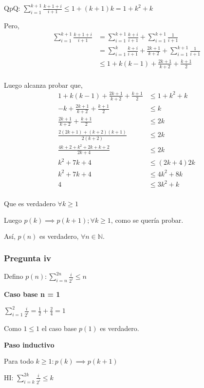 QpQ: $ \sum_{i=1}^{k+1}\frac{k+1+i}{i+1} \leq 1+(k+1)k = 1+k^2 + k$

Pero,
\begin{align*}
    \sum_{i=1}^{k+1}\frac{k+1+i}{i+1} &= \sum_{i=1}^{k+1}\frac{k+i}{i+1} + \sum_{i=1}^{k+1}\frac{1}{i+1} \\
    &= \sum_{i=1}^{k}\frac{k+i}{i+1} + \frac{2k+1}{k+2} + \sum_{i=1}^{k+1}\frac{1}{i+1} \\
    &\leq 1+k(k-1) + \frac{2k+1}{k+2} + \frac{k+1}{2} \\
\end{align*}

Luego alcanza probar que,
\begin{align*}
    1+k(k-1) + \frac{2k+1}{k+2} + \frac{k+1}{2} &\leq 1+k^2 + k \\
    - k + \frac{2k+1}{k+2} + \frac{k+1}{2} &\leq k \\
    \frac{2k+1}{k+2} + \frac{k+1}{2} &\leq 2k \\
    \frac{2(2k+1) + (k+2)(k+1)}{2(k+2)} &\leq 2k \\
    \frac{4k+2 + k^2+2k+k+2}{2k+4} &\leq 2k \\
    k^2 + 7k + 4 &\leq (2k+4)2k \\
    k^2 + 7k + 4 &\leq 4k^2 + 8k \\
    4 &\leq 3k^2 + k\\
\end{align*}

Que es verdadero $\forall k \geq 1$

Luego $p(k) \implies p(k+1); \forall k \geq 1$, como se quería probar.

Así, $p(n)$ es verdadero, $\forall n \in \mathbb{N}$.

\subsubsection{Pregunta iv}

Defino $ p(n): \sum_{i=n}^{2n}\frac{i}{2^i} \leq n$

\textbf{Caso base n = 1}

$ \sum_{i=1}^{2}\frac{i}{2^i} = \frac{1}{2} + \frac{2}{4} = 1 $

Como $ 1 \leq 1 $ el caso base $p(1)$ es verdadero.

\textbf{Paso inductivo}

Para todo $k \geq 1: p(k) \implies p(k+1)$

HI: $\sum_{i=k}^{2k}\frac{i}{2^i} \leq k$

